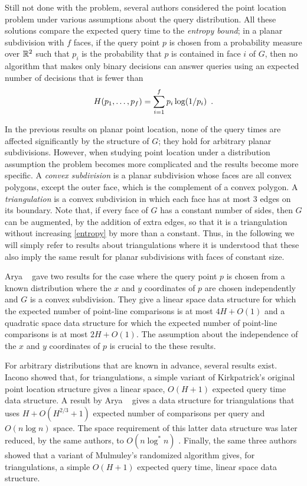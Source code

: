 \documentclass[charterfonts,lotsofwhite]{patmorin}
\begin{document}
Still not done with the problem, several authors considered the point
location problem under various assumptions about the query
distribution.  All these solutions compare the expected query time to
the \emph{entropy bound};  in a planar subdivision with $f$ faces, if the query
point $p$ is chosen from a probability measure over $\mathbb{R}^2$ such that
$p_i$ is the probability that $p$ is contained in face $i$ of $G$,
then no algorithm that makes only binary decisions can answer queries
using an expected number of decisions that is fewer than 
\begin{equation}
    H(p_1,\ldots,p_f) = \sum_{i=1}^f p_i\log(1/p_i) \enspace . 
	\eqlabel{entropy}
	\eqlabel{entropy-face}
\end{equation}

In the previous results on planar point location, none of the query
times are affected significantly by the structure of $G$;  they hold
for arbitrary planar subdivisions.  However, when studying point
location under a distribution assumption the problem becomes more
complicated and the results become more specific.  A \emph{convex
subdivision} is a planar subdivision whose faces are all convex
polygons, except the outer face, which is the complement of a convex
polygon.  A \emph{triangulation} is a convex subdivision in which each
face has at most 3 edges on its boundary.  Note that, if every face of
$G$ has a constant number of sides, then $G$ can be augmented, by the
addition of extra edges, so that it is a triangulation without
increasing \eqref{entropy} by more than a constant.  Thus, in the
following we will simply refer to results about triangulations where
it is understood that these also imply the same result for planar
subdivisions with faces of constant size.

Arya \etal\ \cite{acmr00} gave two results for the case where the
query point $p$ is chosen from a known distribution where the $x$ and
$y$ coordinates of $p$ are chosen independently and $G$ is a convex
subdivision.  They give a linear space data structure for which the
expected number of point-line comparisons is at most $4H+O(1)$ and a
quadratic space data structure for which the expected number of
point-line comparisons is at most $2H+O(1)$.  The assumption about the
independence of the $x$ and $y$ coordinates of $p$ is crucial to the
these results.

For arbitrary distributions that are known in advance, several results
exist.  Iacono \cite{i01,i04} showed that, for triangulations, a
simple variant of Kirkpatrick's original point location structure
gives a linear space, $O(H+1)$ expected query time data structure.  A
result by Arya \etal\ \cite{amm00} gives a data structure for
triangulations that uses $H + O(H^{2/3}+1)$ expected number of
comparisons per query and $O(n\log n)$ space.  The space requirement
of this latter data structure was later reduced, by the same authors,
to $O(n\log^* n)$ \cite{amm01a}.  Finally, the same three authors
\cite{amm01b} showed that a variant of Mulmuley's randomized algorithm
gives, for triangulations, a simple $O(H+1)$ expected query time,
linear space data structure.
\end{document}
